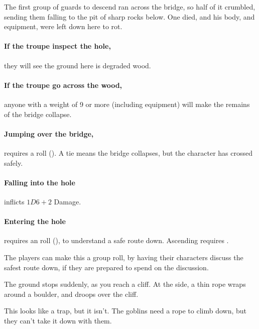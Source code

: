 \begin{multicols}{2}
\begin{exampletext}
  The first group of \glspl{guard} to descend ran across the bridge, so half of it crumbled, sending them falling to the pit of sharp rocks below.
  One died, and his body, and equipment, were left down here to rot.
\end{exampletext}

\paragraph{If the troupe inspect the hole,}
they will see the ground here is degraded wood.

\paragraph{If the troupe go across the wood,}
anyone with a \gls{weight} of 9 or more (including equipment) will make the remains of the bridge collapse.

\paragraph{Jumping over the bridge,}
requires a  roll (\tn[9]).
A tie means the bridge collapses, but the character has crossed safely.

\paragraph{Falling into the hole}
inflicts $1D6+2$ Damage.

\paragraph{Entering the hole}
requires an  roll (\tn[10]), to understand a safe route down.
Ascending requires \tn[12].

The players can make this a group roll, by having their characters discuss the safest route down, if they are prepared to spend  on the discussion.

\begin{boxtext}
  The ground stops suddenly, as you reach a cliff.
  At the side, a thin rope wraps around a boulder, and droops over the cliff.
\end{boxtext}


This looks like a trap, but it isn't.
The goblins need a rope to climb down, but they can't take it down with them.


\end{multicols}
